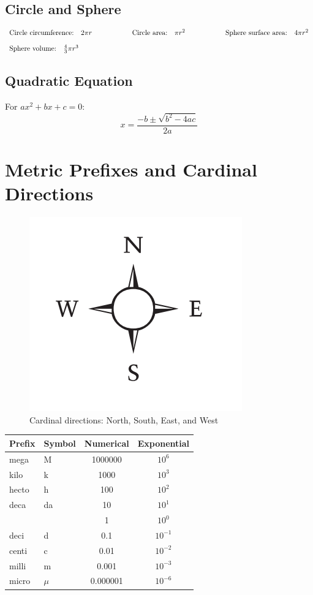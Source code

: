 \documentclass[12pt,a4paper]{article}
\begin{document}
\subsection{Circle and Sphere}
\begin{align*}
  \begin{array}{l@{\hspace{2cm}}l@{\hspace{2cm}}l}
    \text{Circle circumference:} \quad 2\pi r & \text{Circle area:} \quad \pi r^2 & \text{Sphere surface area:} \quad 4\pi r^2 \\[1em]
    \text{Sphere volume:} \quad \frac{4}{3}\pi r^3 & &
  \end{array}
\end{align*}

\subsection{Quadratic Equation}
For $ax^2 + bx + c = 0$: 
\[x = \frac{-b \pm \sqrt{b^2 - 4ac}}{2a}\]

\section{Metric Prefixes and Cardinal Directions}
\begin{figure}[H]
    \centering
    \includegraphics[width=0.4\linewidth]{11 Formula Sheet/nesw.png}
    \caption{Cardinal directions: North, South, East, and West}
    \label{fig:Cardinal directions}
\end{figure}

\begin{table}[H]
\centering
\begin{tabular}{@{}llcc@{}}
\toprule
Prefix & Symbol & Numerical & Exponential \\
\midrule
mega & M & 1000000 & $10^6$ \\
kilo & k & 1000 & $10^3$ \\
hecto & h & 100 & $10^2$ \\
deca & da & 10 & $10^1$ \\
 &  & 1 & $10^0$ \\
deci & d & 0.1 & $10^{-1}$ \\
centi & c & 0.01 & $10^{-2}$ \\
milli & m & 0.001 & $10^{-3}$ \\
micro & $\mu$ & 0.000001 & $10^{-6}$ \\
\bottomrule
\end{tabular}
\end{table}
\end{document}
